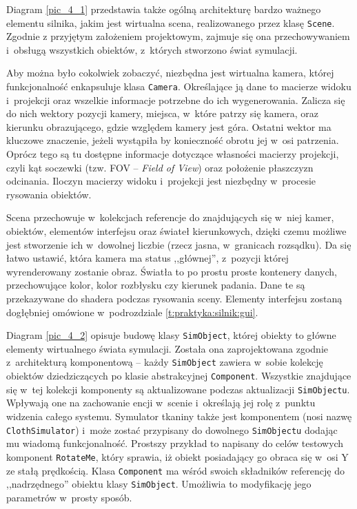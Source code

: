		
		Diagram \ref{pic_4_1} przedstawia także ogólną architekturę bardzo ważnego elementu silnika, jakim jest wirtualna scena, realizowanego przez klasę \texttt{Scene}. Zgodnie z przyjętym założeniem projektowym, zajmuje się ona przechowywaniem i~obsługą wszystkich obiektów, z~których stworzono świat symulacji. 
		
		Aby można było cokolwiek zobaczyć, niezbędna jest wirtualna kamera, której funkcjonalność enkapsuluje klasa \texttt{Camera}. Określające ją dane to macierze widoku i~projekcji oraz wszelkie informacje potrzebne do ich wygenerowania. Zalicza się do nich wektory pozycji kamery, miejsca, w~które patrzy się kamera, oraz kierunku obrazującego, gdzie względem kamery jest góra. Ostatni wektor ma kluczowe znaczenie, jeżeli wystąpiła by konieczność obrotu jej w~osi patrzenia. Oprócz tego są tu dostępne informacje dotyczące własności macierzy projekcji, czyli kąt soczewki (tzw. FOV -- \emph{Field of View}) oraz położenie płaszczyzn odcinania. Iloczyn macierzy widoku i~projekcji jest niezbędny w~procesie rysowania obiektów.
		
		Scena przechowuje w~kolekcjach referencje do znajdujących się w~niej kamer, obiektów, elementów interfejsu oraz świateł kierunkowych, dzięki czemu możliwe jest stworzenie ich w~dowolnej liczbie (rzecz jasna, w~granicach rozsądku). Da się łatwo ustawić, która kamera ma status ,,głównej'', z~pozycji której wyrenderowany zostanie obraz. Światła to po prostu proste kontenery danych, przechowujące kolor, kolor rozbłysku czy kierunek padania. Dane te są przekazywane do shadera podczas rysowania sceny. Elementy interfejsu zostaną dogłębniej omówione w~podrozdziale \ref{t:praktyka:silnik:gui}.
		
		Diagram \ref{pic_4_2} opisuje budowę klasy \texttt{SimObject}, której obiekty to główne elementy wirtualnego świata symulacji. Została ona zaprojektowana zgodnie z~architekturą komponentową -- każdy \texttt{SimObject} zawiera w~sobie kolekcję obiektów dziedziczących po klasie abstrakcyjnej \texttt{Component}. Wszystkie znajdujące się w~tej kolekcji komponenty są aktualizowane podczas aktualizacji \texttt{SimObjectu}. Wpływają one na zachowanie encji w~scenie i~określają jej rolę z~punktu widzenia całego systemu. Symulator tkaniny także jest komponentem (nosi nazwę \texttt{ClothSimulator}) i~może zostać przypisany do dowolnego \texttt{SimObjectu} dodając mu wiadomą funkcjonalność. Prostszy przykład to napisany do celów testowych komponent \texttt{RotateMe}, który sprawia, iż obiekt posiadający go obraca się w~osi Y ze stałą prędkością. Klasa \texttt{Component} ma wśród swoich składników referencję do ,,nadrzędnego'' obiektu klasy \texttt{SimObject}. Umożliwia to modyfikację jego parametrów w~prosty sposób.
		
